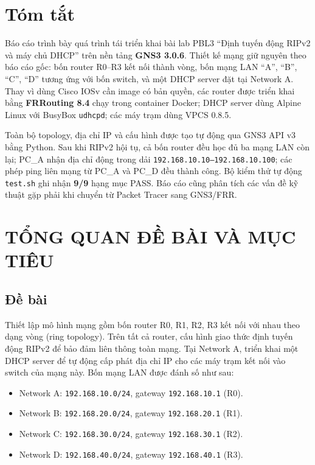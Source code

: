 \documentclass[12pt,a4paper]{article}
\begin{document}
\newpage
\section*{Tóm tắt}

Báo cáo trình bày quá trình tái triển khai bài lab PBL3 ``Định tuyến động RIPv2 và máy chủ DHCP''
trên nền tảng \textbf{GNS3 3.0.6}. Thiết kế mạng giữ nguyên theo báo cáo gốc: bốn router R0--R3
kết nối thành vòng, bốn mạng LAN ``A'', ``B'', ``C'', ``D'' tương ứng với bốn switch, và một DHCP
server đặt tại Network A. Thay vì dùng Cisco IOSv cần image có bản quyền, các router được triển khai
bằng \textbf{FRRouting 8.4} chạy trong container Docker; DHCP server dùng Alpine Linux với BusyBox
\texttt{udhcpd}; các máy trạm dùng VPCS 0.8.5.

Toàn bộ topology, địa chỉ IP và cấu hình được tạo tự động qua GNS3 API v3 bằng Python. Sau khi
RIPv2 hội tụ, cả bốn router đều học đủ ba mạng LAN còn lại; PC\_A nhận địa chỉ động trong dải
\texttt{192.168.10.10--192.168.10.100}; các phép ping liên mạng từ PC\_A và PC\_D đều thành công.
Bộ kiểm thử tự động \texttt{test.sh} ghi nhận \textbf{9/9} hạng mục PASS. Báo cáo cũng phân tích
các vấn đề kỹ thuật gặp phải khi chuyển từ Packet Tracer sang GNS3/FRR.

\newpage
\tableofcontents
\newpage

\section{TỔNG QUAN ĐỀ BÀI VÀ MỤC TIÊU}

\subsection{Đề bài}

Thiết lập mô hình mạng gồm bốn router R0, R1, R2, R3 kết nối với nhau theo dạng vòng
(ring topology). Trên tất cả router, cấu hình giao thức định tuyến động RIPv2 để bảo đảm
liên thông toàn mạng. Tại Network A, triển khai một DHCP server để tự động cấp phát địa chỉ
IP cho các máy trạm kết nối vào switch của mạng này. Bốn mạng LAN được đánh số như sau:

\begin{itemize}[leftmargin=1.6em,itemsep=2pt]
  \item Network A: \texttt{192.168.10.0/24}, gateway \texttt{192.168.10.1} (R0).
  \item Network B: \texttt{192.168.20.0/24}, gateway \texttt{192.168.20.1} (R1).
  \item Network C: \texttt{192.168.30.0/24}, gateway \texttt{192.168.30.1} (R2).
  \item Network D: \texttt{192.168.40.0/24}, gateway \texttt{192.168.40.1} (R3).
\end{itemize}
\end{document}
